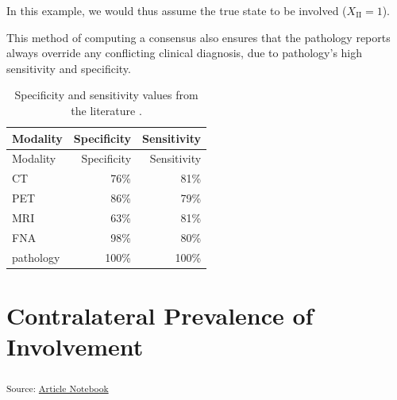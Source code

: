 \documentclass[
  sn-mathphys-num,
]{sn-jnl}
\begin{document}
In this example, we would thus assume the true state to be involved
(\(X_\text{II} = 1\)).

This method of computing a consensus also ensures that the pathology
reports always override any conflicting clinical diagnosis, due to
pathology's high sensitivity and specificity.

\begin{longtable}[]{@{}lrr@{}}
\caption{Specificity and sensitivity values from the literature
\citep{de_bondt_detection_2007, kyzas_18f-fluorodeoxyglucose_2008}.}\label{tbl-spec-sens}\tabularnewline
\toprule\noalign{}
Modality & Specificity & Sensitivity \\
\midrule\noalign{}
\endfirsthead
\toprule\noalign{}
Modality & Specificity & Sensitivity \\
\midrule\noalign{}
\endhead
\bottomrule\noalign{}
\endlastfoot
CT & 76\% & 81\% \\
PET & 86\% & 79\% \\
MRI & 63\% & 81\% \\
FNA & 98\% & 80\% \\
pathology & 100\% & 100\% \\
\end{longtable}

\section{Contralateral Prevalence of
Involvement}\label{contralateral-prevalence-of-involvement}

\textsubscript{Source:
\href{https://rmnldwg.github.io/bilateral-paper/manuscript-preview.html}{Article
Notebook}}
\end{document}
